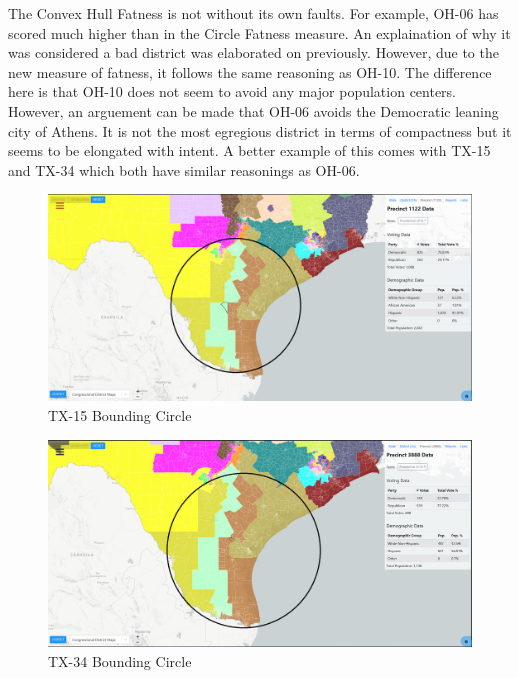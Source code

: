 \documentclass[letterpaper]{article}
\begin{document}

The Convex Hull Fatness is not without its own faults. For example, OH-06 has scored much higher than in the Circle Fatness measure. An explaination of why it was considered a bad district was elaborated on previously. However, due to the new measure of fatness, it follows the same reasoning as OH-10. The difference here is that OH-10 does not seem to avoid any major population centers. However, an arguement can be made that OH-06 avoids the Democratic leaning city of Athens. It is not the most egregious district in terms of compactness but it seems to be elongated with intent. A better example of this comes with TX-15 and TX-34 which both have similar reasonings as OH-06.

\begin{figure}[H]
	\includegraphics[width=\linewidth]{./figures/TX-15-BoundingCircle.png}
	\caption{TX-15 Bounding Circle}
	\label{fig:tx15boundingCircle}
\end{figure}

\begin{figure}[H]
	\includegraphics[width=\linewidth]{./figures/TX-34-BoundingCircle.png}
	\caption{TX-34 Bounding Circle}
	\label{fig:tx34boundingCircle}
\end{figure}
\end{document}
